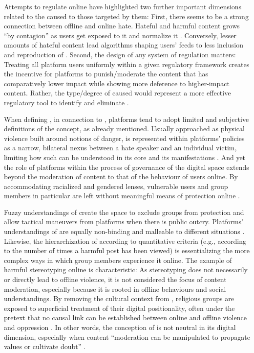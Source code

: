 \documentclass[output=paper,colorlinks,citecolor=brown]{langscibook}
\begin{document}
Attempts to regulate online  have highlighted two further important dimensions related to the  caused to those targeted by them: First, there seems to be a strong connection between offline and online hate. Hateful and harmful content grows ``by contagion'' as users get exposed to it and normalize it \citep{beknazar-yuzbashev_et_al2022}. Conversely, lesser amounts of hateful content lead algorithms shaping users' feeds to less inclusion and reproduction of . Second, the design of any system of regulation matters: Treating all platform users uniformly within a given regulatory framework creates the incentive for platforms to punish/moderate the content that has comparatively lower impact while showing more deference to higher-impact content. Rather, the type/degree of  caused would represent a more effective regulatory tool to identify and eliminate  \citep[3]{andres_slivko2023}.

When defining , in connection to , platforms tend to adopt limited and subjective definitions of the concept, as already mentioned. Usually approached as physical violence built around notions of danger,  is represented within platforms' policies as a narrow, bilateral nexus between a hate speaker and an individual victim, limiting how such  can be understood in its core and its manifestations \citep[64]{decook_cotter_kanthawala_foyle2022}. And yet the role of platforms within the process of governance of the digital space extends beyond the moderation of content to that of the behaviour of users online. By accommodating racialized and gendered lenses, vulnerable users and  group members in particular are left without meaningful means of protection online \citep[66]{decook_cotter_kanthawala_foyle2022}.

Fuzzy understandings of  create the space to exclude  groups from protection and allow tactical maneuvers from platforms when there is public outcry. Platforms' understandings of  are equally non-binding and malleable to different situations \citep[70]{decook_cotter_kanthawala_foyle2022}. Likewise, the hierarchization of  according to quantitative criteria (e.g., according to the number of times a harmful post has been viewed) is essentializing the more complex ways in which  group members experience it online. The example of harmful stereotyping online is characteristic: As stereotyping does not necessarily or directly lead to offline violence, it is not considered the focus of content moderation, especially because it is rooted in offline behaviours and social understandings. By removing the cultural context from , religious  groups are exposed to superficial treatment of their digital positionality, often under the pretext that no causal link can be established between online  and offline violence and oppression \citep[72]{decook_cotter_kanthawala_foyle2022}. In other words, the conception of  is not neutral in its digital dimension, especially when content ``moderation can be manipulated to propagate values or cultivate doubt'' \citep[75]{decook_cotter_kanthawala_foyle2022}.
\end{document}
